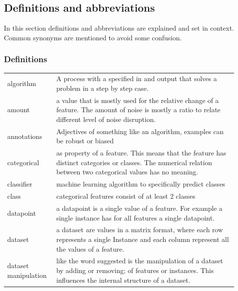 \documentclass[a4paper,10pt]{article}
\begin{document}
\subsection{Definitions and abbreviations}
In this section definitions and abbreviations are explained and set in context. Common synonyms are mentioned to avoid some confusion.
\subsubsection{Definitions}

\begin{tabular}{ p{0.20\linewidth} p{0.7437\linewidth} }
	
	
	algorithm & A process with a specified in and output that solves a problem in a step by step case.\\ [1ex]
	
	amount & a value that is mostly used for the relative change of a feature. The amount of noise is mostly a ratio to relate different level of noise disruption. \\[1ex]	
	
	annotations & Adjectives of something like an algorithm, examples can be robust or biased\\ [1ex]
	
	categorical & as property of a feature. This means that the feature has distinct categories or classes. The numerical relation between two categorical values has no meaning. \\ [1ex]
	
	classifier & machine learning algorithm to specifically predict classes \\ [1ex]
	
	class	 & categorical features consist of at least 2 classes\\ [1ex]
	
	datapoint & a datapoint is a single value of a feature. For example a single instance has for all features a single datapoint.\\[1ex]
	
	dataset & a dataset are values in a matrix format, where each row represents a single Instance and each column represent all the values of a feature.\\ [1ex]
	
	dataset manipulation & like the word suggested is the manipulation of a dataset by adding or removing; of features or instances. This influences the internal structure of a dataset.  \\ [1ex]
	

\end{tabular}
\end{document}
